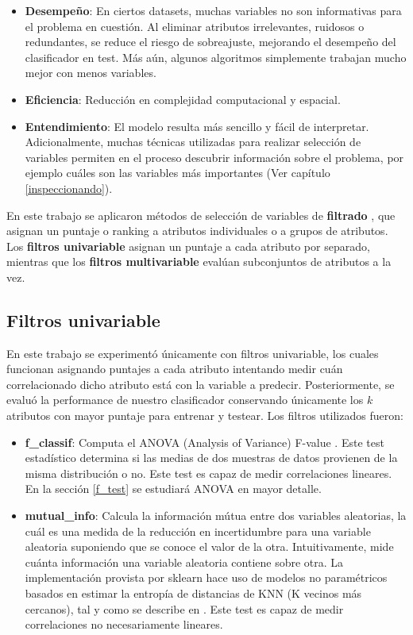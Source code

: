 \begin{itemize}
\item \textbf{Desempeño}: En ciertos datasets, muchas variables no son informativas para el problema en cuestión. Al eliminar atributos irrelevantes, ruidosos o redundantes, se reduce el riesgo de sobreajuste, mejorando el desempeño del clasificador en test. Más aún, algunos algoritmos simplemente trabajan mucho mejor con menos variables. 
\item \textbf{Eficiencia}: Reducción en complejidad computacional y espacial.
\item \textbf{Entendimiento}: El modelo resulta más sencillo y fácil de interpretar. Adicionalmente, muchas técnicas utilizadas para realizar selección de variables permiten en el proceso descubrir información sobre el problema, por ejemplo cuáles son las variables más importantes (Ver capítulo \ref{inspeccionando}).
\end{itemize}

En este trabajo se aplicaron métodos de selección de variables de \textbf{filtrado} \cite{fs4}, que asignan un puntaje o ranking a atributos individuales o a grupos de atributos. Los \textbf{filtros univariable} asignan un puntaje a cada atributo por separado, mientras que los \textbf{filtros multivariable} evalúan subconjuntos de atributos a la vez. 

\subsection{Filtros univariable}

\label{filtros_univ}

En este trabajo se experimentó únicamente con filtros univariable, los cuales funcionan asignando puntajes a cada atributo intentando medir cuán correlacionado dicho atributo está con la variable a predecir. Posteriormente, se evaluó la performance de nuestro clasificador conservando únicamente los $k$ atributos con mayor puntaje para entrenar y testear. Los filtros utilizados fueron:

\begin{itemize}
\item \textbf{f\_classif}: Computa el ANOVA (Analysis of Variance) F-value \cite{han2012mining}. Este test estadístico determina si las medias de dos muestras de datos provienen de la misma distribución o no. Este test es capaz de medir correlaciones lineares. En la sección \ref{f_test} se estudiará ANOVA en mayor detalle.

\item \textbf{mutual\_info}: Calcula la información mútua  \cite{han2012mining} entre dos variables aleatorias, la cuál es una medida de la reducción en incertidumbre para una variable aleatoria suponiendo que se conoce el valor de la otra. Intuitivamente, mide cuánta información una variable aleatoria contiene sobre otra. La implementación provista por sklearn hace uso de modelos no paramétricos basados en estimar la entropía de distancias de KNN (K vecinos más cercanos), tal y como se describe en \cite{mutual_info}. Este test es capaz de medir correlaciones no necesariamente lineares.
\end{itemize}

